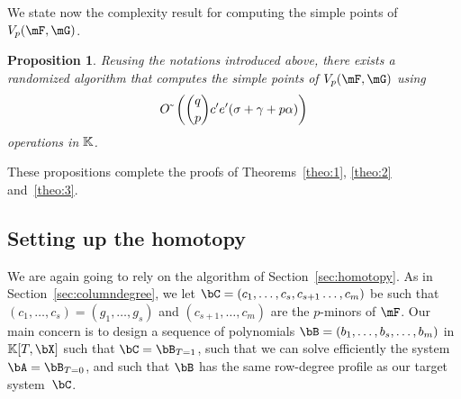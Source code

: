 \documentclass[12pt]{article}
\newtheorem{proposition}[definition]{Proposition}
\begin{document}
We state now the complexity result for computing the simple
points of $\VpFG{p}{\mF}{\mG}$.

\begin{proposition}\label{prop:rowdegree_simple}
  Reusing the notations introduced above, there
  exists a randomized algorithm that computes the simple
  points of $\VpFG{p}{\mF}{\mG}$ using
  $${O}{\,\tilde{ }\,}\left({q \choose p} {c'}{} {e'}{} (\sigma + \gamma+ p \alpha)
  \right)$$ operations in $\mathbb{K}$.
\end{proposition}
These propositions complete the proofs of Theorems~\ref{theo:1},
\ref{theo:2} and~\ref{theo:3}. 


\subsection{Setting up the homotopy}

We are again going to rely on the algorithm of
Section~\ref{sec:homotopy}. As in Section~\ref{sec:columndegree}, we
let $\bC=(c_1,\dots,c_s,c_{s+1}\dots,c_m)$ be such that
$(c_1,\dots,c_s)=(g_1,\dots,g_s)$ and $(c_{s+1},\dots,c_m)$ are the
$p$-minors of $\mF$. Our main concern is to design a sequence of
polynomials $\bB=(b_1,\dots,b_s,\dots,b_m)$ in $\KK[T,\bX]$ such that
$\bC=\bB_{T=1}$, such that we can solve efficiently the system
$\bA=\bB_{T=0}$, and such that $\bB$ has the same row-degree profile
as our target system~$\bC$.
\end{document}
